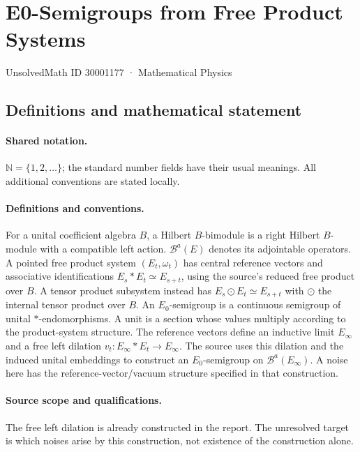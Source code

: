 \documentclass[11pt]{article}
\begin{document}
\setcounter{section}{30001176}
\section{E0-Semigroups from Free Product Systems}\label{30001177}
{\small UnsolvedMath ID 30001177 · Mathematical Physics}
\subsection{Definitions and mathematical statement}

\paragraph{Shared notation.}$\mathbb N=\{1,2,\ldots\}$; the standard number fields have their usual meanings. All additional conventions are stated locally.


\paragraph{Definitions and conventions.} For a unital coefficient algebra $B$, a Hilbert $B$-bimodule is a right Hilbert $B$-module with a compatible left action. $\mathcal B^a(E)$ denotes its adjointable operators. A pointed free product system $(E_t,\omega_t)$ has central reference vectors and associative identifications $E_s*E_t\simeq E_{s+t}$, using the source's reduced free product over $B$. A tensor product subsystem instead has $E_s\odot E_t\simeq E_{s+t}$ with $\odot$ the internal tensor product over $B$. An $E_0$-semigroup is a continuous semigroup of unital $*$-endomorphisms. A unit is a section whose values multiply according to the product-system structure. The reference vectors define an inductive limit $E_\infty$ and a free left dilation $v_t:E_\infty*E_t\to E_\infty$. The source uses this dilation and the induced unital embeddings to construct an $E_0$-semigroup on $\mathcal B^a(E_\infty)$. A noise here has the reference-vector/vacuum structure specified in that construction.

\paragraph{Source scope and qualifications.} The free left dilation is already constructed in the report. The unresolved target is which noises arise by this construction, not existence of the construction alone.
\end{document}
